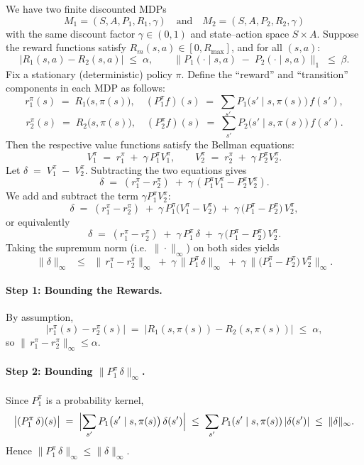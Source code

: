 We have two finite discounted MDPs
\[
  M_{1} = (S, A, P_{1}, R_{1}, \gamma)
  \quad\text{and}\quad
  M_{2} = (S, A, P_{2}, R_{2}, \gamma)
\]
with the same discount factor $\gamma \in (0,1)$ and state--action space $S \times A$. 
Suppose the reward functions satisfy 
$R_m(s,a)\in[0,R_{\max}]$, and for all $(s,a)$:
\[
  |R_{1}(s,a) - R_{2}(s,a)| \;\le\;\alpha,
  \qquad
  \bigl\|P_{1}(\cdot \mid s,a) \;-\; P_{2}(\cdot \mid s,a)\bigr\|_{1} \;\le\;\beta.
\]
Fix a stationary (deterministic) policy $\pi$. Define the ``reward'' and ``transition'' components in each MDP as follows:
\[
  r_{1}^{\pi}(s) \;=\; R_{1}\bigl(s,\pi(s)\bigr), 
  \quad
  (P_{1}^{\pi} f)(s) \;=\; \sum_{s'} P_{1}\bigl(s'\mid s, \pi(s)\bigr)\,f(s'),
\]
\[
  r_{2}^{\pi}(s) \;=\; R_{2}\bigl(s,\pi(s)\bigr), 
  \quad
  (P_{2}^{\pi} f)(s) \;=\; \sum_{s'} P_{2}\bigl(s'\mid s, \pi(s)\bigr)\,f(s').
\]
Then the respective value functions satisfy the Bellman equations:
\[
  V_{1}^{\pi} \;=\; r_{1}^{\pi} \;+\; \gamma\,P_{1}^{\pi} V_{1}^{\pi},
  \qquad
  V_{2}^{\pi} \;=\; r_{2}^{\pi} \;+\; \gamma\,P_{2}^{\pi} V_{2}^{\pi}.
\]
Let $\delta \;=\; V_{1}^{\pi} \;-\; V_{2}^{\pi}$.  Subtracting the two equations gives
\[
  \delta \;=\; (r_{1}^{\pi}-r_{2}^{\pi})
              \;+\;\gamma\,(P_{1}^{\pi}V_{1}^{\pi} - P_{2}^{\pi} V_{2}^{\pi}).
\]
We add and subtract the term $\gamma P_{1}^{\pi} V_{2}^{\pi}$:
\[
  \delta \;=\; (r_{1}^{\pi}-r_{2}^{\pi})
              \;+\;\gamma\,P_{1}^{\pi}\bigl(V_{1}^{\pi} - V_{2}^{\pi}\bigr)
              \;+\;\gamma\,\bigl(P_{1}^{\pi} - P_{2}^{\pi}\bigr)\,V_{2}^{\pi},
\]
or equivalently
\[
  \delta \;=\;(r_{1}^{\pi}-r_{2}^{\pi})
             \;+\;\gamma\,P_{1}^{\pi}\,\delta
             \;+\;\gamma\,\bigl(P_{1}^{\pi}-P_{2}^{\pi}\bigr)\,V_{2}^{\pi}.
\]
Taking the supremum norm (i.e.\ $\|\cdot\|_{\infty}$) on both sides yields
\[
  \|\delta\|_{\infty}
  \;\;\le\;\;
  \|\,r_{1}^{\pi}-r_{2}^{\pi}\|_{\infty}
  \;+\;\gamma\,\bigl\|P_{1}^{\pi}\,\delta\bigr\|_{\infty}
  \;+\;\gamma\,\bigl\|\bigl(P_{1}^{\pi}-P_{2}^{\pi}\bigr)\,V_{2}^{\pi}\bigr\|_{\infty}.
\]

\paragraph{Step 1: Bounding the Rewards.}
By assumption,
\[
   \bigl|r_{1}^{\pi}(s) - r_{2}^{\pi}(s)\bigr|
   \;=\;
   \bigl|R_{1}(s,\pi(s)) - R_{2}(s,\pi(s))\bigr|
   \;\le\;\alpha,
\]
so $\|\,r_{1}^{\pi} - r_{2}^{\pi}\|_{\infty} \le \alpha$.

\paragraph{Step 2: Bounding $\|P_{1}^{\pi}\,\delta\|_{\infty}$.}
Since $P_{1}^{\pi}$ is a probability kernel,
\[
  \bigl|(P_{1}^{\pi}\,\delta)(s)\bigr|
  \;=\;
  \Bigl|\sum_{s'} P_{1}\bigl(s'\mid s,\pi(s)\bigr)\,\delta(s')\Bigr|
  \;\le\;
  \sum_{s'}P_{1}(s'\mid s,\pi(s))\,|\delta(s')|
  \;\le\;\|\delta\|_{\infty}.
\]
Hence $\bigl\|P_{1}^{\pi}\,\delta\bigr\|_{\infty} \le \|\delta\|_{\infty}.$

